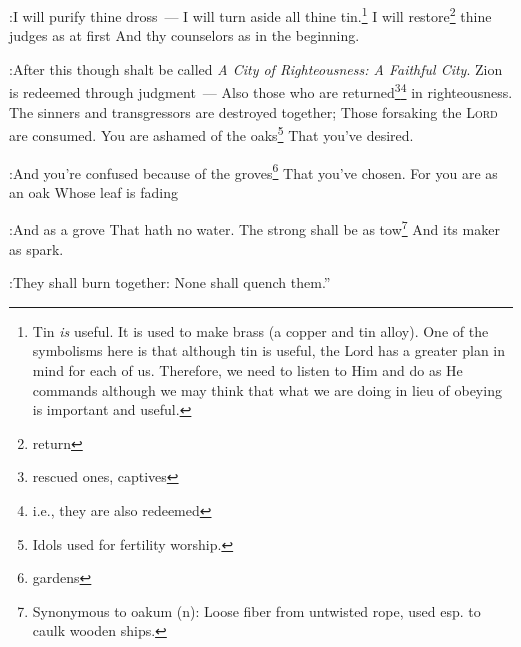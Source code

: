 \begin{inparaenum}
:I will purify thine dross~--- I will turn aside all thine tin.\footnote{Tin \emph{is} useful. It is used to make brass (a copper and tin alloy). One of the symbolisms here is that although tin is useful, the Lord has a greater plan in mind for each of us. Therefore, we need to listen to Him and do as He commands although we may think that what we are doing in lieu of obeying is important and useful.}%
   I will restore\footnote{return} thine judges as at first And thy counselors as in the beginning.%

:After this though shalt be called \textit{A City of Righteousness: A Faithful City}.%
   Zion is redeemed through judgment~--- Also those who are returned\footnote{rescued ones, captives}\footnote{i.e., they are also redeemed} in righteousness.%
   The sinners and transgressors are destroyed together; Those forsaking the \textsc{Lord} are consumed.%
   You are ashamed of the oaks\footnote{Idols used for fertility worship.} That you've desired.%

:And you're confused because of the groves\footnote{gardens} That you've chosen.%
   For you are as an oak Whose leaf is fading%

:And as a grove That hath no water.%
   The strong shall be as tow\footnote{Synonymous to oakum (n): Loose fiber from untwisted rope, used esp. to caulk wooden ships.} And its maker as spark.%

:They shall burn together: None shall quench them.''%
\end{inparaenum}
